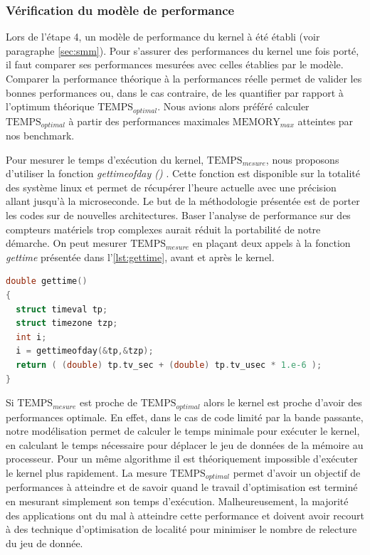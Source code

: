 \subsubsection{Vérification du modèle de performance}

Lors de l'étape 4, un modèle de performance du kernel à été établi (voir paragraphe \ref{sec:smm}). Pour s'assurer des performances du kernel une fois porté, il faut comparer ses performances mesurées avec celles établies par le modèle. Comparer la performance théorique à la performances réelle permet de valider les bonnes performances ou, dans le cas contraire, de les quantifier par rapport à l'optimum théorique $\text{TEMPS}_{optimal}$. Nous avions alors préféré calculer $\text{TEMPS}_{optimal}$ à partir des performances maximales $\text{MEMORY}_{max}$ atteintes par nos benchmark.

Pour mesurer le temps d'exécution du kernel, $\text{TEMPS}_{mesure}$, nous proposons d'utiliser la fonction \textit{gettimeofday ()} \cite{Linux}. Cette fonction est disponible sur la totalité des système linux et permet de récupérer l'heure actuelle avec une précision allant jusqu'à la microseconde. Le but de la méthodologie présentée est de porter les codes sur de nouvelles architectures. Baser l'analyse de performance sur des compteurs matériels trop complexes aurait réduit la portabilité de notre démarche. On peut mesurer  $\text{TEMPS}_{mesure}$ en plaçant deux appels à la fonction \textit{gettime} présentée dans l'\autoref{lst:gettime}, avant et après le kernel.


\begin{lstlisting}[language=c,caption=Fonction utilisée pour lire la date actuelle avec une précision allant jusqu'à la microseconde,label={lst:gettime}, 
  basicstyle=\footnotesize, frame=tb,
  xleftmargin=.065\textwidth, xrightmargin=.065\textwidth]
double gettime()
{
  struct timeval tp;
  struct timezone tzp;
  int i;
  i = gettimeofday(&tp,&tzp);
  return ( (double) tp.tv_sec + (double) tp.tv_usec * 1.e-6 );
}
\end{lstlisting}

Si $\text{TEMPS}_{mesure}$ est proche de $\text{TEMPS}_{optimal}$ alors le kernel est proche d'avoir des performances optimale. En effet, dans le cas de code limité par la bande passante, notre modélisation permet de calculer le temps minimale pour exécuter le kernel, en calculant le temps nécessaire pour déplacer le jeu de données de la mémoire au processeur. Pour un même algorithme il est théoriquement impossible d'exécuter le kernel plus rapidement. La mesure $\text{TEMPS}_{optimal}$ permet d'avoir un objectif de performances à atteindre et de savoir quand le travail d'optimisation est terminé en mesurant simplement son temps d'exécution. Malheureusement, la majorité des applications ont du mal à atteindre cette performance et doivent avoir recourt à des technique d'optimisation de localité pour minimiser le nombre de relecture du jeu de donnée. 




